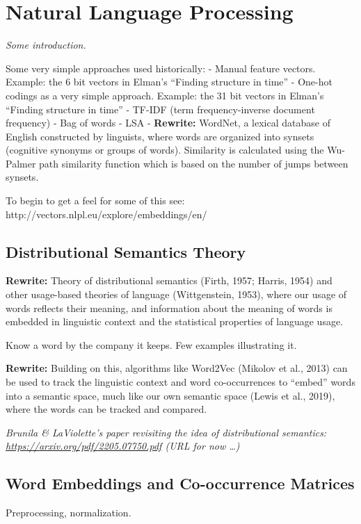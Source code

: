 \chapter{Natural Language Processing}\label{ch_nlp}

\textit{Some introduction.}

Some very simple approaches used historically:
- Manual feature vectors.  Example: the 6 bit vectors in Elman's ``Finding structure in time''
- One-hot codings as a very simple approach. Example: the 31 bit vectors  in Elman's ``Finding structure in time''
- TF-IDF (term frequency-inverse document frequency)
- Bag of words
- LSA
- \textbf{Rewrite:} WordNet, a lexical database of English constructed by linguists, where words are organized into synsets (cognitive synonyms or groups of words). Similarity is calculated using the Wu-Palmer path similarity function which is based on the number of jumps between synsets.

To begin to get a feel for some of this see: http://vectors.nlpl.eu/explore/embeddings/en/

\section{Distributional Semantics Theory}
\textbf{Rewrite:} Theory of distributional semantics (Firth, 1957; Harris, 1954) and other usage-based theories of language (Wittgenstein, 1953), where our usage of words reflects their meaning, and information about the meaning of words is embedded in linguistic context and the statistical properties of language usage. 

Know a word by the company it keeps.
Few examples illustrating it.

\textbf{Rewrite:} Building on this, algorithms like Word2Vec (Mikolov et al., 2013) can be used to track the linguistic context and word co-occurrences to ``embed'' words into a semantic space, much like our own semantic space (Lewis et al., 2019), where the words can be tracked and compared. 

\textit{Brunila \& LaViolette's paper revisiting the idea of distributional semantics: \url{https://arxiv.org/pdf/2205.07750.pdf} (URL for now \dots)}

\section{Word Embeddings and Co-occurrence Matrices}

Preprocessing, normalization.

